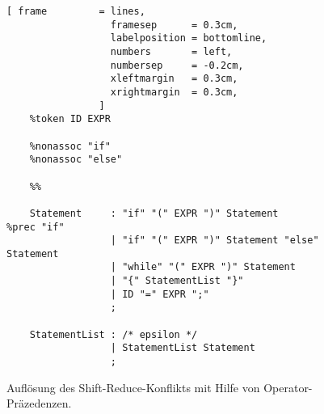 \begin{enumerate}
            \begin{figure}[!ht]
\centering
\begin{Verbatim}[ frame         = lines, 
                  framesep      = 0.3cm, 
                  labelposition = bottomline,
                  numbers       = left,
                  numbersep     = -0.2cm,
                  xleftmargin   = 0.3cm,
                  xrightmargin  = 0.3cm,
                ]
    %token ID EXPR 
    
    %nonassoc "if"
    %nonassoc "else"
    
    %%
    
    Statement     : "if" "(" EXPR ")" Statement                  %prec "if"
                  | "if" "(" EXPR ")" Statement "else" Statement
                  | "while" "(" EXPR ")" Statement 
                  | "{" StatementList "}"
                  | ID "=" EXPR ";"
                  ;
    
    StatementList : /* epsilon */
                  | StatementList Statement
                  ;
\end{Verbatim}
\vspace*{-0.3cm}
\caption{Aufl\"osung des Shift-Reduce-Konflikts mit Hilfe von Operator-Pr\"azedenzen.}
\label{fig:dangling-else-precedence.y}
\end{figure}
      
\end{enumerate}

